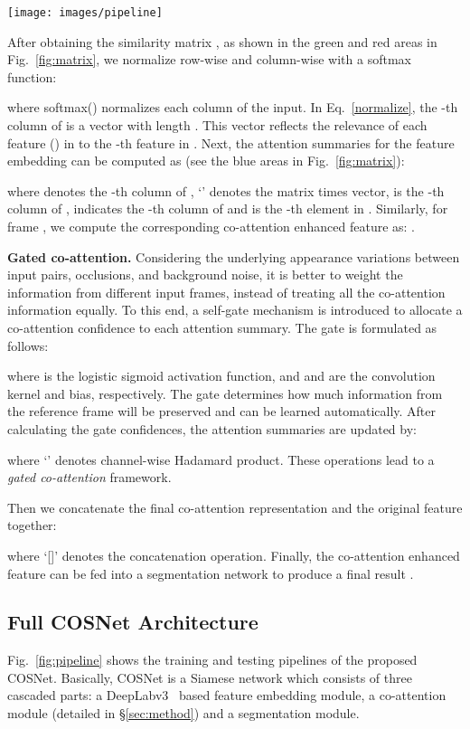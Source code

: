 \documentclass[10pt,twocolumn,letterpaper]{article}
\begin{document}
\begin{figure*}[t]
	\centering
	\texttt{[image: images/pipeline]}
	\caption{Schematic illustration of training pipeline (a)  and  testing pipeline (b) of COSNet. }
	\label{fig:pipeline}
\vspace*{-8pt}
\end{figure*}

After obtaining the similarity matrix , as shown in the green and red areas in Fig.~\ref{fig:matrix}, we normalize  row-wise and column-wise with a softmax function:

where softmax() normalizes each column of the input.
In Eq.~\ref{normalize}, the -th column of  is a vector with length . This vector reflects the relevance of each feature () in  to the -th feature in . Next, the attention summaries for the feature embedding   \wrt  can be computed as (see the blue areas in Fig.~\ref{fig:matrix}):

where  denotes the -th column of ,    `' denotes the matrix times vector,  is the -th column of  ,  indicates the -th column of  and  is the -th  element in .
Similarly, for frame , we compute the corresponding co-attention enhanced feature as: .


\noindent\textbf{Gated co-attention.}
Considering the underlying appearance variations between input pairs, occlusions, and background noise, it is better to weight the information from different input frames, instead of treating all the co-attention information equally. To this end, a self-gate mechanism is introduced to allocate a co-attention confidence to each attention summary. The gate is formulated as follows:

where  is the logistic sigmoid activation function, and  and  are the convolution kernel and bias, respectively.
The gate  determines how much information from the reference frame will be preserved and can be learned automatically. After calculating the gate confidences, the attention summaries are updated by:

where `' denotes channel-wise Hadamard product. These operations lead to a \textit{gated co-attention} framework.

Then we concatenate the final co-attention representation  and the original feature  together:

where `[]' denotes the concatenation operation. Finally, the co-attention enhanced feature  can be fed into a segmentation network to produce a final result .

\subsection{Full COSNet Architecture}\label{sec:architecture}
Fig.~\ref{fig:pipeline} shows the training and testing pipelines of the proposed COSNet.
Basically, COSNet is a Siamese network which consists of three cascaded parts:  a DeepLabv3~\cite{DBLP:journals/corr/ChenPSA17} based feature embedding module, a co-attention module (detailed in \S\ref{sec:method}) and a segmentation module.
\end{document}
